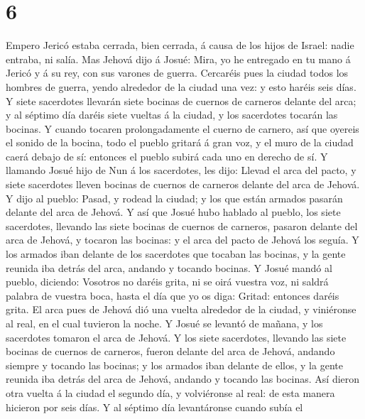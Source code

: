 \hypertarget{section-5}{%
\section{6}\label{section-5}}

 Empero Jericó estaba cerrada, bien cerrada, á causa de
los hijos de Israel: nadie entraba, ni salía.  Mas Jehová
dijo á Josué: Mira, yo he entregado en tu mano á Jericó y á su rey, con
sus varones de guerra.  Cercaréis pues la ciudad todos los
hombres de guerra, yendo alrededor de la ciudad una vez: y esto haréis
seis días.  Y siete sacerdotes llevarán siete bocinas de
cuernos de carneros delante del arca; y al séptimo día daréis siete
vueltas á la ciudad, y los sacerdotes tocarán las bocinas.
 Y cuando tocaren prolongadamente el cuerno de carnero,
así que oyereis el sonido de la bocina, todo el pueblo gritará á gran
voz, y el muro de la ciudad caerá debajo de sí: entonces el pueblo
subirá cada uno en derecho de sí.  Y llamando Josué hijo
de Nun á los sacerdotes, les dijo: Llevad el arca del pacto, y siete
sacerdotes lleven bocinas de cuernos de carneros delante del arca de
Jehová.  Y dijo al pueblo: Pasad, y rodead la ciudad; y
los que están armados pasarán delante del arca de Jehová. 
Y así que Josué hubo hablado al pueblo, los siete sacerdotes, llevando
las siete bocinas de cuernos de carneros, pasaron delante del arca de
Jehová, y tocaron las bocinas: y el arca del pacto de Jehová los seguía.
 Y los armados iban delante de los sacerdotes que tocaban
las bocinas, y la gente reunida iba detrás del arca, andando y tocando
bocinas.  Y Josué mandó al pueblo, diciendo: Vosotros no
daréis grita, ni se oirá vuestra voz, ni saldrá palabra de vuestra boca,
hasta el día que yo os diga: Gritad: entonces daréis grita.
 El arca pues de Jehová dió una vuelta alrededor de la
ciudad, y viniéronse al real, en el cual tuvieron la noche.
 Y Josué se levantó de mañana, y los sacerdotes tomaron
el arca de Jehová.  Y los siete sacerdotes, llevando las
siete bocinas de cuernos de carneros, fueron delante del arca de Jehová,
andando siempre y tocando las bocinas; y los armados iban delante de
ellos, y la gente reunida iba detrás del arca de Jehová, andando y
tocando las bocinas.  Así dieron otra vuelta á la ciudad
el segundo día, y volviéronse al real: de esta manera hicieron por seis
días.  Y al séptimo día levantáronse cuando subía el
